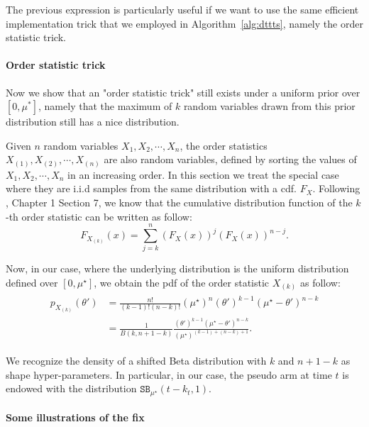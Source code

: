 The previous expression is particularly useful if we want to use the same efficient implementation trick that we employed in Algorithm~\ref{alg:dttts}, namely the order statistic trick.

\paragraph{Order statistic trick}
Now we show that an "order statistic trick" still exists under a uniform prior over $[0,\mu^*]$, namely that the maximum of $k$ random variables drawn from this prior distribution still has a nice distribution.

Given $n$ random variables $X_1, X_2, \cdots, X_n$, the order statistics $X_{(1)}, X_{(2)}, \cdots, X_{(n)}$ are also random variables, defined by sorting the values of $X_1, X_2, \cdots, X_n$ in an increasing order. In this section we treat the special case where they are i.i.d samples from the same distribution with a cdf. $F_X$.
Following \cite{gentle2009}, Chapter 1 Section 7, we know that the cumulative distribution function of the $k$-th order statistic can be written as follow:
\[
    F_{X_{(k)}}(x) = \sum_{j=k}^{n} (F_X(x))^j (F_X(x))^{n-j}.
\]


Now, in our case, where the underlying distribution is the uniform distribution defined over $[0, \mu^\star]$, we obtain the pdf of the order statistic $X_{(k)}$ as follow:
\begin{align*}\label{eq:sb}
\begin{split}
    p_{X_{(k)}}(\theta') &= \frac{n!}{(k-1)!(n-k)!} (\mu^\star)^n (\theta')^{k-1}(\mu^\star-\theta')^{n-k} \\
                        &= \frac{1}{B(k, n+1-k)} \frac{(\theta')^{k-1}(\mu^\star-\theta')^{n-k}}{(\mu^\star)^{(k-1)+(n-k)+1}}.
\end{split}
\end{align*}

We recognize the density of a shifted Beta distribution with $k$ and $n+1-k$ as shape hyper-parameters. In particular, in our case, the pseudo arm at time $t$ is endowed with the distribution $\texttt{SB}_{\mu^\star}(t-k_t,1)$.

\paragraph{Some illustrations of the fix}

